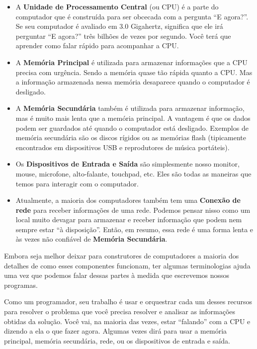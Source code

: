 \begin{itemize}
\item A {\bf Unidade de Processamento Central} (ou CPU) é a parte do computador que é construída para ser obcecada com a pergunta ``E agora?''.  Se seu computador é avaliado em 3.0 Gigahertz, significa que ele irá perguntar ``E agora?'' três bilhões de vezes por segundo. Você terá que aprender como falar rápido para acompanhar a CPU.

\item A {\bf Memória Principal} é utilizada para armazenar informações que a CPU precisa com urgência. Sendo a memória quase tão rápida quanto a CPU. Mas a informação armazenada nessa memória desaparece quando o computador é desligado.
\item A {\bf Memória Secundária} também é utilizada para armazenar informação, mas é muito mais lenta que a memória principal. A vantagem é que os dados podem ser guardados até quando o computador está desligado.  Exemplos de memória secundária são os discos rígidos ou as  memórias flash (tipicamente encontrados em dispositivos USB e reprodutores de música portáteis).

\item Os {\bf Dispositivos de Entrada e Saída} são simplesmente nosso monitor, mouse, microfone, alto-falante, touchpad, etc. Eles são todas as maneiras que temos para interagir com o computador.

\item Atualmente, a maioria dos computadores também tem uma
{\bf Conexão de rede} para receber informações de uma rede.
Podemos pensar nisso como um local muito devagar para armazenar e receber informação que podem nem sempre estar ``à disposição''.  Então, em resumo, essa rede é uma forma lenta e às vezes não confiável de {\bf Memória Secundária}.

\end{itemize}

Embora seja melhor deixar para construtores de computadores a maioria dos detalhes de como esses componentes funcionam, ter algumas terminologias ajuda uma vez que podemos falar dessas partes à medida que escrevemos nossos programas. 

Como um programador, seu trabalho é usar e orquestrar cada um desses recursos para resolver o problema que você precisa resolver e analisar as informações obtidas da solução.  Você vai, na maioria das vezes, estar ``falando'' com a CPU e dizendo a ela o que fazer agora. Algumas vezes dirá para usar a memória principal, memória secundária, rede, ou os dispositivos de entrada e saída.


